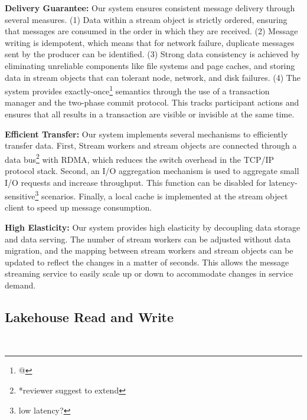 \noindent\textbf{Delivery Guarantee:} Our system ensures consistent message delivery through several measures. (1) Data within a stream object is strictly ordered, ensuring that messages are consumed in the order in which they are received. (2) Message writing is idempotent, which means that for network failure, duplicate messages sent by the producer  can be identified.
 (3) Strong data consistency is achieved by eliminating unreliable components like file systems and page caches, and storing data in  stream objects that can tolerant node, network, and disk failures. (4) The system provides exactly-once\footnote{@} semantics through the use of a transaction manager and the two-phase commit protocol. This tracks participant actions and ensures that all results in a transaction are visible or invisible at the same time.
 

\noindent\textbf{Efficient Transfer:} Our system implements several mechanisms to efficiently transfer data. First, Stream workers and stream objects are connected through a data bus\footnote{*reviewer suggest to extend} with RDMA, which reduces the switch overhead in the TCP/IP protocol stack. Second, an I/O aggregation mechanism is used to aggregate small I/O requests and increase throughput. This function can be disabled for latency-sensitive\footnote{low latency?} scenarios. Finally, a local cache is implemented at the stream object client to speed up message consumption.

\noindent\textbf{High Elasticity:} Our system provides high elasticity by decoupling data storage and data serving. The number of stream workers can be adjusted without data migration, and the mapping between stream workers and stream objects can be updated to reflect the changes in a matter of seconds. This allows the message streaming service to easily scale up or down to accommodate changes in service demand.



\subsection{Lakehouse Read and Write}~\label{subsec:lakehouse}

